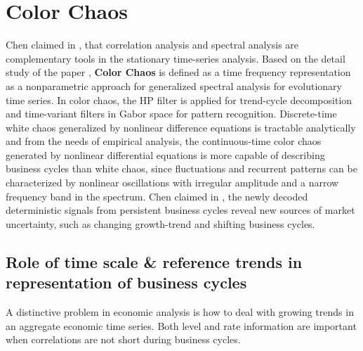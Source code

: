 \section{Color Chaos}

Chen claimed in \cite{pchen}, that correlation analysis and spectral analysis are complementary tools in the stationary time-series analysis. Based on the detail study of the paper \cite{pchen}, \textbf{Color Chaos} is defined as a time frequency representation as a nonparametric approach for generalized spectral analysis for evolutionary time series. In color chaos, the HP filter is applied for trend-cycle decomposition and time-variant filters in Gabor space for pattern recognition.  Discrete-time white chaos generalized by nonlinear difference equations is tractable analytically and from the needs of empirical analysis, the continuous-time color chaos generated by nonlinear differential equations is more capable of describing business cycles than white chaos, since fluctuations and recurrent patterns can be characterized by nonlinear oscillations with irregular amplitude and a narrow frequency band in the spectrum.  Chen claimed in \cite{pchen}, the newly decoded deterministic signals from persistent business cycles reveal new sources of market uncertainty, such as changing growth-trend and shifting business cycles. 


\subsection{Role of time scale \& reference trends in representation of business cycles}

A distinctive problem in economic analysis is how to deal with growing trends in an aggregate economic time series. Both level and rate information are important when correlations are not short during business cycles. 

